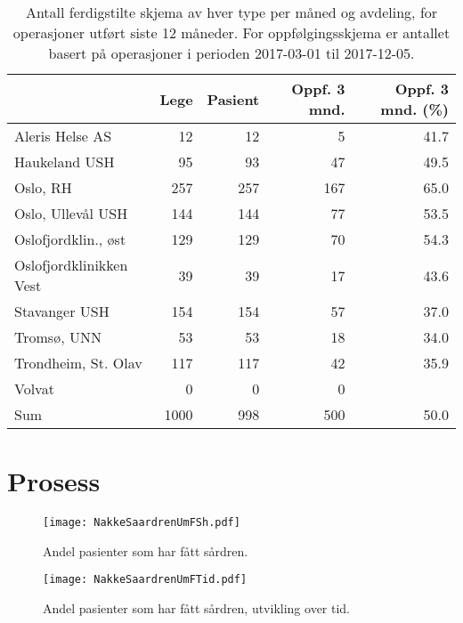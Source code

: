\documentclass[presentation,xcolor=pdftex,dvipsnames,table]{beamer}\usepackage[]{graphicx}\usepackage[]{color}
\begin{document}
\begin{tiny}
\begin{frame}[fragile]
\begin{table}[ht]
\centering
\begin{tabular}{lrrrr}
  \hline
 & Lege & Pasient & Oppf. 3 mnd. & Oppf. 3 mnd. (\%) \\ 
  \hline
Aleris Helse AS & 12 & 12 & 5 & 41.7 \\ 
  Haukeland USH & 95 & 93 & 47 & 49.5 \\ 
  Oslo, RH & 257 & 257 & 167 & 65.0 \\ 
  Oslo, Ullevål USH & 144 & 144 & 77 & 53.5 \\ 
  Oslofjordklin., øst & 129 & 129 & 70 & 54.3 \\ 
  Oslofjordklinikken Vest & 39 & 39 & 17 & 43.6 \\ 
  Stavanger USH & 154 & 154 & 57 & 37.0 \\ 
  Tromsø, UNN & 53 & 53 & 18 & 34.0 \\ 
  Trondheim, St. Olav & 117 & 117 & 42 & 35.9 \\ 
  Volvat & 0 & 0 & 0 &  \\ 
  Sum & 1000 & 998 & 500 & 50.0 \\ 
   \hline
\end{tabular}
\caption{Antall ferdigstilte skjema av hver type per måned og avdeling, for operasjoner
                                  utført siste 12 måneder. For oppfølgingsskjema er antallet basert på operasjoner i perioden 2017-03-01 til 2017-12-05.} 
\end{table}

\end{frame}






\section{Prosess}

\begin{frame}[fragile]
\begin{figure}[ht]
\centering
\texttt{[image: NakkeSaardrenUmFSh.pdf]}
\caption[scale=0.3]{Andel pasienter som har fått sårdren. }
\end{figure}
\end{frame}

\begin{frame}[fragile]
\begin{figure}[ht]
\centering
\texttt{[image: NakkeSaardrenUmFTid.pdf]}
\caption{Andel pasienter som har fått sårdren, utvikling over tid. }
\end{figure}
\end{frame}



\end{tiny}
\end{document}
